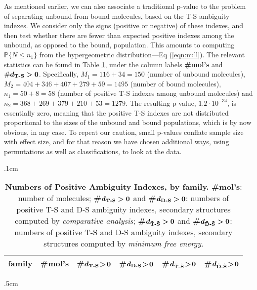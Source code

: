 \documentclass[10pt,letterpaper]{article}
\begin{document}
As mentioned earlier, we can also associate a traditional p-value to the problem of separating unbound from bound molecules, based on the T-S ambiguity indexes. We consider only the signs (positive or negative) of these indexes, and then test whether there are fewer than expected positive indexes among the unbound, as opposed to the bound, population. This amounts to computing $\mathbb{P}\{N\leq n_1\}$ from the hypergeometric distribution---Eq (\ref{eqn:null}). The relevant statistics can be found in Table \ref{table:NumberPositive}, 
under the column labels {\bf \#mol's} and $\bm{\#d_\text{\bf T-S}>0}$. Specifically, 
$M_1=116+34=150$ (number of unbound molecules),
$M_2=404+346+407+279+59=1495$ (number of bound molecules), $n_1=50+8=58$ (number of positive T-S indexes among unbound molecules) and $n_2=368+269+379+210+53=1279$.
The resulting p-value, $1.2\cdot 10^{-34}$, is essentially zero, meaning that the positive T-S indexes are not distributed proportional to the sizes of the unbound and bound populations, which is by now obvious, in any case. To repeat our caution, small p-values conflate sample size with effect size, and for that reason we have chosen additional ways, using permutations as well as classifications, to look at the data.

\vglue .1cm
\begin{table}[h!]
\begin{center}
\begin{tabular}{ l || r | r | r | r | r}
\hglue 5mm 
{\bf family} & {\bf \#mol's} & {\bf\#}$\bm{d_\text{\bf T-S}\!>\!0}$ &
{\bf\#}$\bm{d_\text{\bf D-S}\!>\!0}$ & {\bf\#}$\bm{d_\text{\bf \~T-\~S}\!>\!0}$ & {\bf\#}$\bm{d_\text{\bf \~D-\~S}\!>\!0}$ \\ \hline \hline

\end{tabular}
\vglue .5cm
\caption{\footnotesize {\bf Numbers of Positive Ambiguity Indexes, by family.} 
{\bf \#mol's}: number of molecules; {\bf\#}$\bm{d_\text{\bf T-S}>0}$ and 
 {\bf\#}$\bm{d_\text{\bf D-S}>0}$: numbers of positive T-S and D-S ambiguity indexes, secondary structures computed by {\em comparative analysis}; 
 {\bf\#}$\bm{d_\text{\bf \~T-\~S}>0}$ and {\bf\#}$\bm{d_\text{\bf \~D-\~S}>0}$: numbers of positive T-S and D-S ambiguity indexes, secondary structures computed by {\em minimum free energy}.
} 
\label{table:NumberPositive}
\end{center}
\end{table}
\end{document}
